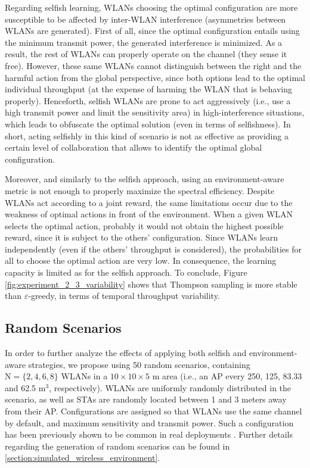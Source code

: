\documentclass{article}
\begin{document}
Regarding selfish learning, WLANs choosing the optimal configuration are more susceptible to be affected by inter-WLAN interference (asymmetries between WLANs are generated). First of all, since the optimal configuration entails using the minimum transmit power, the generated interference is minimized. As a result, the rest of WLANs can properly operate on the channel (they sense it free). However, these same WLANs cannot distinguish between the right and the harmful action from the global perspective, since both options lead to the optimal individual throughput (at the expense of harming the WLAN that is behaving properly). Henceforth, selfish WLANs are prone to act aggressively (i.e., use a high transmit power and limit the sensitivity area) in high-interference situations, which leads to obfuscate the optimal solution (even in terms of selfishness). In short, acting selfishly in this kind of scenario is not as effective as providing a certain level of collaboration that allows to identify the optimal global configuration.

Moreover, and similarly to the selfish approach, using an environment-aware metric is not enough to properly maximize the spectral efficiency. Despite WLANs act according to a joint reward, the same limitations occur due to the weakness of optimal actions in front of the environment. When a given WLAN selects the optimal action, probably it would not obtain the highest possible reward, since it is subject to the others' configuration. Since WLANs learn independently (even if the others' throughput is considered), the probabilities for all to choose the optimal action are very low. In consequence, the learning capacity is limited as for the selfish approach. To conclude, Figure \ref{fig:experiment_2_3_variability} shows that Thompson sampling is more stable than $\varepsilon$-greedy, in terms of temporal throughput variability.

\subsection{Random Scenarios}
\label{section:scalability}	
In order to further analyze the effects of applying both selfish and environment-aware strategies, we propose using 50 random scenarios, containing $\text{N} = \{2, 4, 6, 8\}$ WLANs in a $10\times10\times5$ m area (i.e., an AP every 250, 125, 83.33 and 62.5 $\text{m}^3$, respectively). WLANs are uniformly randomly distributed in the scenario, as well as STAs are randomly located between 1 and 3 meters away from their AP. Configurations are assigned so that WLANs use the same channel by default, and maximum sensitivity and transmit power. Such a configuration has been previously shown to be common in real deployments \cite{akella2007self}. Further details regarding the generation of random scenarios can be found in \ref{section:simulated_wireless_environment}.
\end{document}
